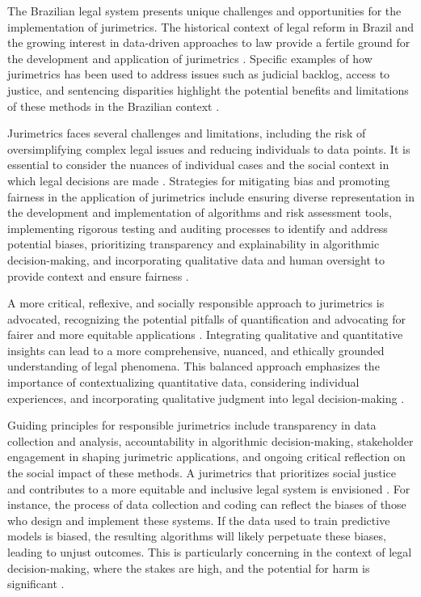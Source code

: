 The Brazilian legal system presents unique challenges and opportunities for the implementation of jurimetrics. The historical context of legal reform in Brazil and the growing interest in data-driven approaches to law provide a fertile ground for the development and application of jurimetrics \cite{10.1007/s11186-021-09453-1,10.3390/fi9040068}. Specific examples of how jurimetrics has been used to address issues such as judicial backlog, access to justice, and sentencing disparities highlight the potential benefits and limitations of these methods in the Brazilian context \cite{10.1007/s11186-021-09453-1,10.3390/fi9040068}.

Jurimetrics faces several challenges and limitations, including the risk of oversimplifying complex legal issues and reducing individuals to data points. It is essential to consider the nuances of individual cases and the social context in which legal decisions are made \cite{10.1007/s11186-021-09453-1}. Strategies for mitigating bias and promoting fairness in the application of jurimetrics include ensuring diverse representation in the development and implementation of algorithms and risk assessment tools, implementing rigorous testing and auditing processes to identify and address potential biases, prioritizing transparency and explainability in algorithmic decision-making, and incorporating qualitative data and human oversight to provide context and ensure fairness \cite{10.1007/s11186-021-09453-1,10.3390/fi9040068}.

A more critical, reflexive, and socially responsible approach to jurimetrics is advocated, recognizing the potential pitfalls of quantification and advocating for fairer and more equitable applications \cite{10.1007/s11186-021-09453-1,10.3390/fi9040068}. Integrating qualitative and quantitative insights can lead to a more comprehensive, nuanced, and ethically grounded understanding of legal phenomena. This balanced approach emphasizes the importance of contextualizing quantitative data, considering individual experiences, and incorporating qualitative judgment into legal decision-making \cite{10.1007/s11186-021-09453-1,10.3390/fi9040068}.

Guiding principles for responsible jurimetrics include transparency in data collection and analysis, accountability in algorithmic decision-making, stakeholder engagement in shaping jurimetric applications, and ongoing critical reflection on the social impact of these methods. A jurimetrics that prioritizes social justice and contributes to a more equitable and inclusive legal system is envisioned \cite{10.1007/s11186-021-09453-1,10.3390/fi9040068}. For instance, the process of data collection and coding can reflect the biases of those who design and implement these systems. If the data used to train predictive models is biased, the resulting algorithms will likely perpetuate these biases, leading to unjust outcomes. This is particularly concerning in the context of legal decision-making, where the stakes are high, and the potential for harm is significant \cite{1023071190721}.

